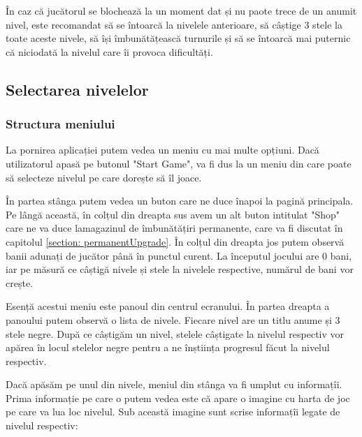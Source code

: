 \documentclass[12pt, a4paper]{article}
\begin{document}
	În caz că jucătorul se blochează la un moment dat și nu paote trece de un anumit nivel, este recomandat să se întoarcă la nivelele anterioare, să câștige 3 stele la toate aceste nivele, să își îmbunătățească turnurile și să se întoarcă mai puternic că niciodată la nivelul care îi provoca dificultăți.
	
	
	
	
	
	\subsection{Selectarea nivelelor}
	\label{section: levelSelection}
	
	\subsubsection{Structura meniului}
	
	La pornirea aplicației putem vedea un meniu cu mai multe opțiuni. Dacă utilizatorul apasă pe butonul "Start Game", va fi dus la un meniu din care poate să selecteze nivelul pe care dorește să îl joace.
	
	În partea stânga putem vedea un buton care ne duce înapoi la pagină principala. Pe lângă această, în colțul din dreapta sus avem un alt buton intitulat "Shop" care ne va duce lamagazinul de îmbunătățiri permanente, care va fi discutat în capitolul \ref{section: permanentUpgrade}. În colțul din dreapta jos putem observă banii adunați de jucător până în punctul curent. La începutul jocului are 0 bani, iar pe măsură ce câștigă nivele și stele la nivelele respective, numărul de bani vor crește.
	\newline
	
	Esență acestui meniu este panoul din centrul ecranului. În partea dreapta a panoului putem observă o lista de nivele. Fiecare nivel are un titlu anume și 3 stele negre. După ce câștigăm un nivel, stelele câștigate la nivelul respectiv vor apărea în locul stelelor negre pentru a ne înștiința progresul făcut la nivelul respectiv.
	\newline
	
	Dacă apăsăm pe unul din nivele, meniul din stânga va fi umplut cu informațîi. Prima informație pe care o putem vedea este că apare o imagine cu harta de joc pe care va lua loc nivelul. Sub această imagine sunt scrise informațîi legate de nivelul respectiv:
	
\end{document}
